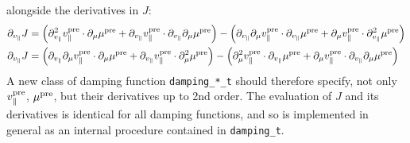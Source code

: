     alongside the derivatives in $J$:
    \begin{align}
        \partial_{v_{\parallel}}J
            &=  \left(\partial_{v_{\parallel}}^{2}v_{\parallel}^{\rm pre}\cdot\partial_{\mu}\mu^{\rm pre} + \partial_{v_{\parallel}}v_{\parallel}^{\rm pre}\cdot\partial_{v_{\parallel}}\partial_{\mu}\mu^{\rm pre}\right)
            - \left(\partial_{v_{\parallel}}\partial_{\mu}v_{\parallel}^{\rm pre}\cdot\partial_{v_{\parallel}}\mu^{\rm pre} + \partial_{\mu}v_{\parallel}^{\rm pre}\cdot\partial_{v_{\parallel}}^{2}\mu^{\rm pre}\right)  \\
        \partial_{v_{\parallel}}J
            &=  \left(\partial_{v_{\parallel}}\partial_{\mu}v_{\parallel}^{\rm pre}\cdot\partial_{\mu}\mu^{\rm pre} + \partial_{v_{\parallel}}v_{\parallel}^{\rm pre}\cdot\partial_{\mu}^{2}\mu^{\rm pre}\right)
            - \left(\partial_{\mu}^{2}v_{\parallel}^{\rm pre}\cdot\partial_{v_{\parallel}}\mu^{\rm pre} + \partial_{\mu}v_{\parallel}^{\rm pre}\cdot\partial_{v_{\parallel}}\partial_{\mu}\mu^{\rm pre}\right)
    \end{align}
    A new class of damping function {\tt damping\_*\_t} should therefore specify, not only $v_{\parallel}^{\rm pre}$, $\mu^{\rm pre}$, but their derivatives up to 2nd order. The evaluation of $J$ and its derivatives is identical for all damping functions, and so is implemented in general as an internal procedure contained in {\tt damping\_t}.